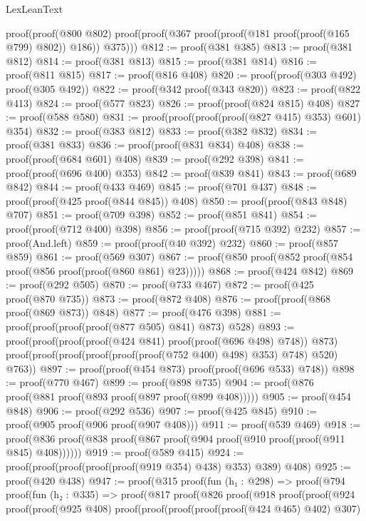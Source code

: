 \begin{lexlean}{LexLeanText}
\begin{coremodule}
      proof(proof(@800 @802)
          proof(proof(@367 proof(proof(@181 proof(proof(@165 @799) @802)) @186)) @375)))
@812 := proof(@381 @385)
@813 := proof(@381 @812)
@814 := proof(@381 @813)
@815 := proof(@381 @814)
@816 := proof(@811 @815)
@817 := proof(@816 @408)
@820 := proof(proof(@303 @492) proof(@305 @492))
@822 := proof(@342 proof(@343 @820))
@823 := proof(@822 @413)
@824 := proof(@577 @823)
@826 := proof(proof(@824 @815) @408)
@827 := proof(@588 @580)
@831 := proof(proof(proof(proof(@827 @415) @353) @601) @354)
@832 := proof(@383 @812)
@833 := proof(@382 @832)
@834 := proof(@381 @833)
@836 := proof(proof(@831 @834) @408)
@838 := proof(proof(@684 @601) @408)
@839 := proof(@292 @398)
@841 := proof(proof(@696 @400) @353)
@842 := proof(@839 @841)
@843 := proof(@689 @842)
@844 := proof(@433 @469)
@845 := proof(@701 @437)
@848 := proof(proof(@425 proof(@844 @845)) @408)
@850 := proof(proof(@843 @848) @707)
@851 := proof(@709 @398)
@852 := proof(@851 @841)
@854 := proof(proof(@712 @400) @398)
@856 := proof(proof(@715 @392) @232)
@857 := proof(And.left)
@859 := proof(proof(@40 @392) @232)
@860 := proof(@857 @859)
@861 := proof(@569 @307)
@867 := proof(@850 proof(@852 proof(@854 proof(@856 proof(proof(@860 @861) @23)))))
@868 := proof(@424 @842)
@869 := proof(@292 @505)
@870 := proof(@733 @467)
@872 := proof(@425 proof(@870 @735))
@873 := proof(@872 @408)
@876 := proof(proof(@868 proof(@869 @873)) @848)
@877 := proof(@476 @398)
@881 := proof(proof(proof(proof(@877 @505) @841) @873) @528)
@893 := proof(proof(proof(proof(@424 @841) proof(proof(@696 @498) @748)) @873)
      proof(proof(proof(proof(proof(proof(@752 @400) @498) @353) @748) @520) @763))
@897 := proof(proof(@454 @873) proof(proof(@696 @533) @748))
@898 := proof(@770 @467)
@899 := proof(@898 @735)
@904 := proof(@876 proof(@881 proof(@893 proof(@897 proof(@899 @408)))))
@905 := proof(@454 @848)
@906 := proof(@292 @536)
@907 := proof(@425 @845)
@910 := proof(@905 proof(@906 proof(@907 @408)))
@911 := proof(@539 @469)
@918 := proof(@836 proof(@838 proof(@867 proof(@904 proof(@910 proof(proof(@911 @845) @408))))))
@919 := proof(@589 @415)
@924 := proof(proof(proof(proof(proof(@919 @354) @438) @353) @389) @408)
@925 := proof(@420 @438)
@947 := proof(@315
      proof(fun (h₁ : @298) =>
        proof(@794
            proof(fun (h₂ : @335) =>
              proof(@817
                  proof(@826
                      proof(@918
                          proof(proof(@924
                                proof(proof(@925 @408)
                                    proof(proof(proof(proof(proof(@424 @465) @402) @307)

\end{coremodule}
\end{lexlean}
